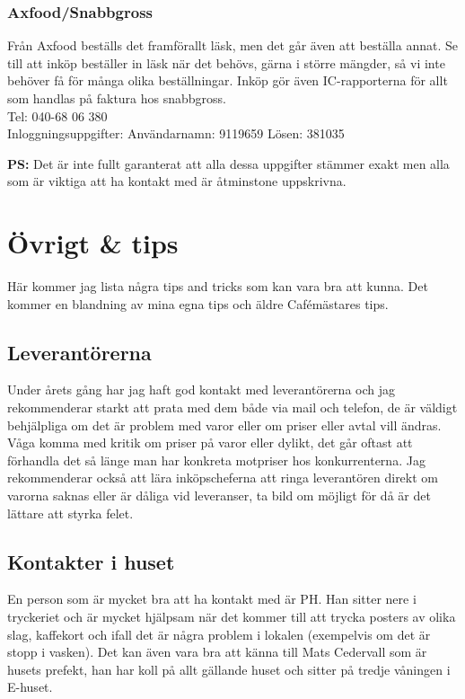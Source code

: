 \documentclass[10pt]{article}
\begin{document}
\subsubsection*{Axfood/Snabbgross}
Från Axfood beställs det framförallt läsk, men det går även att beställa annat. Se till att inköp beställer in läsk när det behövs, gärna i större mängder, så vi inte behöver få för många olika beställningar. Inköp gör även IC-rapporterna för allt som handlas på faktura hos snabbgross.\\
Tel: {040-68 06 380}\\
Inloggningsuppgifter: Användarnamn: {9119659} Lösen: {381035}

\textbf{PS:} Det är inte fullt garanterat att alla dessa uppgifter stämmer exakt men alla som är viktiga att ha kontakt med är åtminstone uppskrivna.

\section{Övrigt \& tips}
Här kommer jag lista några tips and tricks som kan vara bra att kunna. Det kommer en blandning av mina egna tips och äldre Cafémästares tips.

\subsection{Leverantörerna}
Under årets gång har jag haft god kontakt med leverantörerna och jag rekommenderar starkt att prata med dem både via mail och telefon, de är väldigt behjälpliga om det är problem med varor eller om priser eller avtal vill ändras. Våga komma med kritik om priser på varor eller dylikt, det går oftast att förhandla det så länge man har konkreta motpriser hos konkurrenterna. Jag rekommenderar också att lära inköpscheferna att ringa leverantören direkt om varorna saknas eller är dåliga vid leveranser, ta bild om möjligt för då är det lättare att styrka felet.

\subsection{Kontakter i huset}
En person som är mycket bra att ha kontakt med är PH. Han sitter nere i tryckeriet och är mycket hjälpsam när det kommer till att trycka posters av olika slag, kaffekort och ifall det är några problem i lokalen (exempelvis om det är stopp i vasken).
Det kan även vara bra att känna till Mats Cedervall som är husets prefekt, han har koll på allt gällande huset och sitter på tredje våningen i E-huset.
\end{document}
